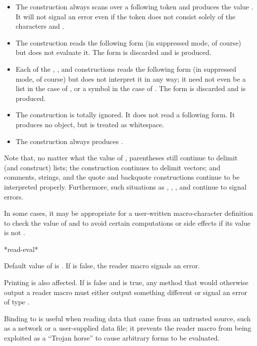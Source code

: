 \begin{defun}[Variable]
\begin{itemize}
\item
The \cd{\#*} construction always scans over a following token and
produces the value {\nil}.
It will not signal an error even if the token does not consist solely
of the characters  and .
\end{itemize}

\begin{itemize}
\item
The  construction reads the following
form (in suppressed mode, of course) but does not evaluate it.
The form is discarded and {\nil} is produced.
\end{itemize}


\begin{itemize}
\item
Each of the , , and \cd{\#:}
constructions reads the following
form (in suppressed mode, of course) but does not interpret it in any way;
it need not even be a list in the case of , or a symbol
in the case of \cd{\#:}.  The form is discarded and {\nil} is produced.

\item
The \cd{\#=} construction is totally ignored.  It does not read
a following form.  It produces no object, but is treated as whitespace.

\item
The \cd{\#\#} construction always produces {\nil}.
\end{itemize}
Note that, no matter what the value of ,
parentheses still continue to delimit (and construct) lists;
the \cd{\#(} construction continues to delimit vectors;
and comments, strings, and the quote and backquote constructions continue to be
interpreted properly.  Furthermore, such situations as
,
\cd{\#<}, \cd{\#)}, and  continue to signal errors.

In some cases, it may be appropriate for a user-written macro-character
definition to check the value of  and to avoid certain
computations or side effects if its value is not {\nil}.
\end{defun}

\begin{defun}[Variable]
*read-eval*

Default value of  is .
If  is false, the  reader macro signals an error.

Printing is also affected.  If
   is false and  is true, any 
  method that would otherwise output a  reader macro must either output something
  different or signal an error of type .

Binding  to  is useful when reading data that came from
  an untrusted source, such as a network or a user-supplied data file; it
  prevents the  reader macro from being exploited as a ``Trojan horse'' to
  cause arbitrary forms to be evaluated.
\end{defun}

